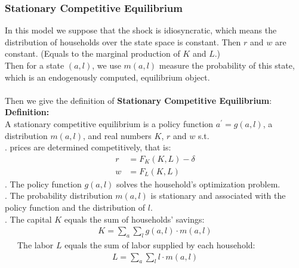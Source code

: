 \documentclass{article}
\begin{document}
\subsubsection{Stationary Competitive Equilibrium}
In this model we suppose that the shock is idiosyncratic, which means the distribution of households over the state space is constant. Then $r$ and $w$ are constant. (Equals to the marginal production of $K$ and $L$.)\\
Then for a state $(a, l)$, we use $m(a, l)$ measure the probability of this state, which is an endogenously computed, equilibrium object.\\\\
Then we give the definition of \textbf{Stationary Competitive Equilibrium}:\\
\textbf{Definition:}\\
A stationary competitive equilibrium is a policy function $a^\prime = g(a, l)$, a distribution $m(a, l)$, and real numbers $K$, $r$ and $w$ s.t.\\
. prices are determined competitively, that is:
	\begin{align*}
		r &= F_K(K, L) - \delta\\
		w &= F_L(K, L)
	\end{align*}  
. The policy function $g(a, l)$ solves the household's optimization problem.\\ 
. The probability distribution $m(a, l)$ is stationary and associated with the policy function and the distribution of $l$.\\
. The capital $K$ equals the sum of households' savings:
	\begin{align*}
		K = \sum\limits_a \sum\limits_l g(a, l)\cdot m(a, l)
	\end{align*}
\indent\ \ \  The labor $L$ equals the sum of labor supplied by each household:
	\begin{align*}
		L = \sum\limits_a \sum\limits_l l \cdot m(a, l)
	\end{align*}
\end{document}
